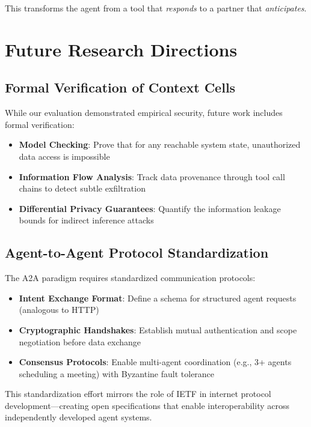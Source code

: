 This transforms the agent from a tool that \textit{responds} to a partner that \textit{anticipates}.

\section{Future Research Directions}

\subsection{Formal Verification of Context Cells}

While our evaluation demonstrated empirical security, future work includes formal verification:

\begin{itemize}
    \item \textbf{Model Checking}: Prove that for any reachable system state, unauthorized data access is impossible
    \item \textbf{Information Flow Analysis}: Track data provenance through tool call chains to detect subtle exfiltration
    \item \textbf{Differential Privacy Guarantees}: Quantify the information leakage bounds for indirect inference attacks
\end{itemize}

\subsection{Agent-to-Agent Protocol Standardization}

The A2A paradigm requires standardized communication protocols:

\begin{itemize}
    \item \textbf{Intent Exchange Format}: Define a schema for structured agent requests (analogous to HTTP)
    \item \textbf{Cryptographic Handshakes}: Establish mutual authentication and scope negotiation before data exchange
    \item \textbf{Consensus Protocols}: Enable multi-agent coordination (e.g., 3+ agents scheduling a meeting) with Byzantine fault tolerance
\end{itemize}

This standardization effort mirrors the role of IETF in internet protocol development—creating open specifications that enable interoperability across independently developed agent systems.

